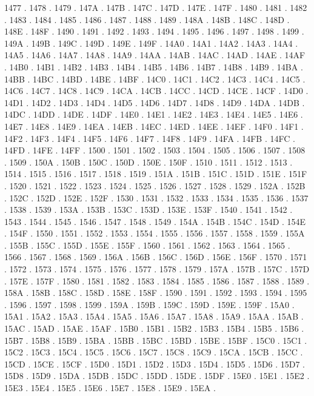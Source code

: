 1477 .
1478 .
1479 .
147A .
147B .
147C .
147D .
147E .
147F .
1480 .
1481 .
1482 .
1483 .
1484 .
1485 .
1486 .
1487 .
1488 .
1489 .
148A .
148B .
148C .
148D .
148E .
148F .
1490 .
1491 .
1492 .
1493 .
1494 .
1495 .
1496 .
1497 .
1498 .
1499 .
149A .
149B .
149C .
149D .
149E .
149F .
14A0 .
14A1 .
14A2 .
14A3 .
14A4 .
14A5 .
14A6 .
14A7 .
14A8 .
14A9 .
14AA .
14AB .
14AC .
14AD .
14AE .
14AF .
14B0 .
14B1 .
14B2 .
14B3 .
14B4 .
14B5 .
14B6 .
14B7 .
14B8 .
14B9 .
14BA .
14BB .
14BC .
14BD .
14BE .
14BF .
14C0 .
14C1 .
14C2 .
14C3 .
14C4 .
14C5 .
14C6 .
14C7 .
14C8 .
14C9 .
14CA .
14CB .
14CC .
14CD .
14CE .
14CF .
14D0 .
14D1 .
14D2 .
14D3 .
14D4 .
14D5 .
14D6 .
14D7 .
14D8 .
14D9 .
14DA .
14DB .
14DC .
14DD .
14DE .
14DF .
14E0 .
14E1 .
14E2 .
14E3 .
14E4 .
14E5 .
14E6 .
14E7 .
14E8 .
14E9 .
14EA .
14EB .
14EC .
14ED .
14EE .
14EF .
14F0 .
14F1 .
14F2 .
14F3 .
14F4 .
14F5 .
14F6 .
14F7 .
14F8 .
14F9 .
14FA .
14FB .
14FC .
14FD .
14FE .
14FF .
1500 .
1501 .
1502 .
1503 .
1504 .
1505 .
1506 .
1507 .
1508 .
1509 .
150A .
150B .
150C .
150D .
150E .
150F .
1510 .
1511 .
1512 .
1513 .
1514 .
1515 .
1516 .
1517 .
1518 .
1519 .
151A .
151B .
151C .
151D .
151E .
151F .
1520 .
1521 .
1522 .
1523 .
1524 .
1525 .
1526 .
1527 .
1528 .
1529 .
152A .
152B .
152C .
152D .
152E .
152F .
1530 .
1531 .
1532 .
1533 .
1534 .
1535 .
1536 .
1537 .
1538 .
1539 .
153A .
153B .
153C .
153D .
153E .
153F .
1540 .
1541 .
1542 .
1543 .
1544 .
1545 .
1546 .
1547 .
1548 .
1549 .
154A .
154B .
154C .
154D .
154E .
154F .
1550 .
1551 .
1552 .
1553 .
1554 .
1555 .
1556 .
1557 .
1558 .
1559 .
155A .
155B .
155C .
155D .
155E .
155F .
1560 .
1561 .
1562 .
1563 .
1564 .
1565 .
1566 .
1567 .
1568 .
1569 .
156A .
156B .
156C .
156D .
156E .
156F .
1570 .
1571 .
1572 .
1573 .
1574 .
1575 .
1576 .
1577 .
1578 .
1579 .
157A .
157B .
157C .
157D .
157E .
157F .
1580 .
1581 .
1582 .
1583 .
1584 .
1585 .
1586 .
1587 .
1588 .
1589 .
158A .
158B .
158C .
158D .
158E .
158F .
1590 .
1591 .
1592 .
1593 .
1594 .
1595 .
1596 .
1597 .
1598 .
1599 .
159A .
159B .
159C .
159D .
159E .
159F .
15A0 .
15A1 .
15A2 .
15A3 .
15A4 .
15A5 .
15A6 .
15A7 .
15A8 .
15A9 .
15AA .
15AB .
15AC .
15AD .
15AE .
15AF .
15B0 .
15B1 .
15B2 .
15B3 .
15B4 .
15B5 .
15B6 .
15B7 .
15B8 .
15B9 .
15BA .
15BB .
15BC .
15BD .
15BE .
15BF .
15C0 .
15C1 .
15C2 .
15C3 .
15C4 .
15C5 .
15C6 .
15C7 .
15C8 .
15C9 .
15CA .
15CB .
15CC .
15CD .
15CE .
15CF .
15D0 .
15D1 .
15D2 .
15D3 .
15D4 .
15D5 .
15D6 .
15D7 .
15D8 .
15D9 .
15DA .
15DB .
15DC .
15DD .
15DE .
15DF .
15E0 .
15E1 .
15E2 .
15E3 .
15E4 .
15E5 .
15E6 .
15E7 .
15E8 .
15E9 .
15EA .
